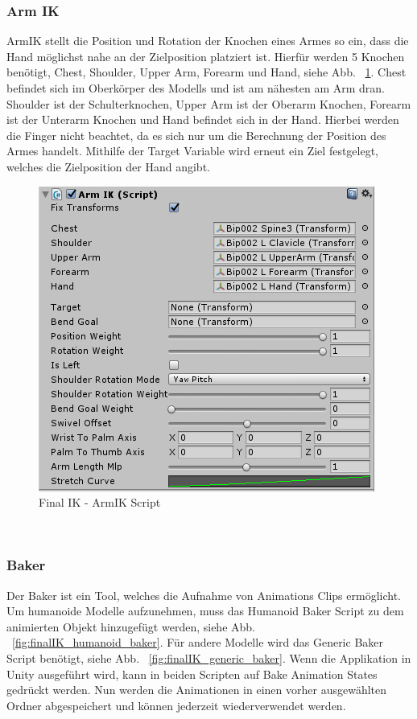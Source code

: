 \subsubsection{Arm IK}
ArmIK stellt die Position und Rotation der Knochen eines Armes so ein, dass die Hand möglichst nahe an der Zielposition platziert ist.
Hierfür werden 5 Knochen benötigt, Chest, Shoulder, Upper Arm, Forearm und Hand, siehe Abb. ~\ref{fig:finalIK_armIK_script}.
Chest befindet sich im Oberkörper des Modells und ist am nähesten am Arm dran.
Shoulder ist der Schulterknochen, Upper Arm ist der Oberarm Knochen, Forearm ist der Unterarm Knochen und Hand befindet sich in der Hand.
Hierbei werden die Finger nicht beachtet, da es sich nur um die Berechnung der Position des Armes handelt.
Mithilfe der Target Variable wird erneut ein Ziel festgelegt, welches die Zielposition der Hand angibt.
\begin {figure}
    \centering
    \includegraphics[scale=1]{pics/finalik_armik_script}
    \caption{Final IK - ArmIK Script}
    \label{fig:finalIK_armIK_script}
\end {figure}
~\cite{FinalIK_ArmIK_2021}

\subsubsection{Baker}
Der Baker ist ein Tool, welches die Aufnahme von Animations Clips ermöglicht.
Um humanoide Modelle aufzunehmen, muss das Humanoid Baker Script zu dem animierten Objekt hinzugefügt werden, siehe Abb. ~\ref{fig:finalIK_humanoid_baker}.
Für andere Modelle wird das Generic Baker Script benötigt, siehe Abb. ~\ref{fig:finalIK_generic_baker}.
Wenn die Applikation in Unity ausgeführt wird, kann in beiden Scripten auf Bake Animation States gedrückt werden.
Nun werden die Animationen in einen vorher ausgewählten Ordner abgespeichert und können jederzeit wiederverwendet werden.

